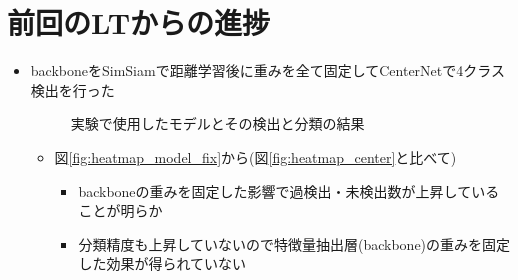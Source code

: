 \documentclass[a4j]{ujarticle}
\newcommand{\Fref}[1]{\mbox{図\ref{fig:#1}}}
\begin{document}
\clearpage

    \section{前回のLTからの進捗}
        \begin{itemize}
            \item backboneをSimSiam\cite{simsiam}で距離学習後に重みを全て固定してCenterNet\cite{centernet}で4クラス検出を行った

            \begin{figure}[h]
                \centering
                \caption{実験で使用したモデルとその検出と分類の結果}
            \end{figure}

            \begin{itemize}
                \item \Fref{heatmap_model_fix}から(\Fref{heatmap_center}と比べて)
                \begin{itemize}
                    \item backboneの重みを固定した影響で過検出・未検出数が上昇していることが明らか
                    \item 分類精度も上昇していないので特徴量抽出層(backbone)の重みを固定した効果が得られていない
                \end{itemize}
            \end{itemize}
        

\end{itemize}
\end{document}
